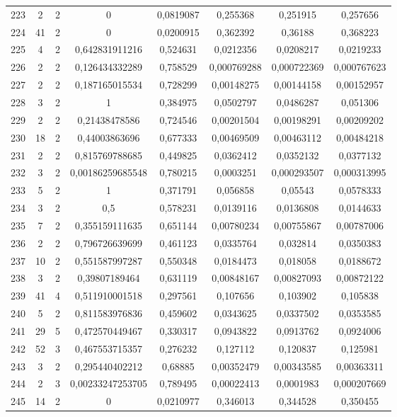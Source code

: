 \begin{longtable}{|c|c|c|c|c|c|c|c|}
223 & 2 & 2 & 0 & 0,0819087 & 0,255368 & 0,251915 & 0,257656  \\
224 & 41 & 2 & 0 & 0,0200915 & 0,362392 & 0,36188 & 0,368223  \\
225 & 4 & 2 & 0,642831911216 & 0,524631 & 0,0212356 & 0,0208217 & 0,0219233  \\
226 & 2 & 2 & 0,126434332289 & 0,758529 & 0,000769288 & 0,000722369 & 0,000767623  \\
227 & 2 & 2 & 0,187165015534 & 0,728299 & 0,00148275 & 0,00144158 & 0,00152957  \\
228 & 3 & 2 & 1 & 0,384975 & 0,0502797 & 0,0486287 & 0,051306  \\
229 & 2 & 2 & 0,21438478586 & 0,724546 & 0,00201504 & 0,00198291 & 0,00209202  \\
230 & 18 & 2 & 0,44003863696 & 0,677333 & 0,00469509 & 0,00463112 & 0,00484218  \\
231 & 2 & 2 & 0,815769788685 & 0,449825 & 0,0362412 & 0,0352132 & 0,0377132  \\
232 & 3 & 2 & 0,00186259685548 & 0,780215 & 0,0003251 & 0,000293507 & 0,000313995  \\
233 & 5 & 2 & 1 & 0,371791 & 0,056858 & 0,05543 & 0,0578333  \\
234 & 3 & 2 & 0,5 & 0,578231 & 0,0139116 & 0,0136808 & 0,0144633  \\
235 & 7 & 2 & 0,355159111635 & 0,651144 & 0,00780234 & 0,00755867 & 0,00787006  \\
236 & 2 & 2 & 0,796726639699 & 0,461123 & 0,0335764 & 0,032814 & 0,0350383  \\
237 & 10 & 2 & 0,551587997287 & 0,550348 & 0,0184473 & 0,018058 & 0,0188672  \\
238 & 3 & 2 & 0,39807189464 & 0,631119 & 0,00848167 & 0,00827093 & 0,00872122  \\
239 & 41 & 4 & 0,511910001518 & 0,297561 & 0,107656 & 0,103902 & 0,105838  \\
240 & 5 & 2 & 0,811583976836 & 0,459602 & 0,0343625 & 0,0337502 & 0,0353585  \\
241 & 29 & 5 & 0,472570449467 & 0,330317 & 0,0943822 & 0,0913762 & 0,0924006  \\
242 & 52 & 3 & 0,467553715357 & 0,276232 & 0,127112 & 0,120837 & 0,125981  \\
243 & 3 & 2 & 0,295440402212 & 0,68885 & 0,00352479 & 0,00343585 & 0,00363311  \\
244 & 2 & 3 & 0,00233247253705 & 0,789495 & 0,00022413 & 0,0001983 & 0,000207669  \\
245 & 14 & 2 & 0 & 0,0210977 & 0,346013 & 0,344528 & 0,350455  \\

\end{longtable}
